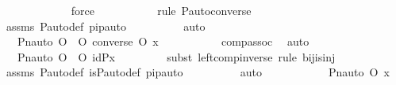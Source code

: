 \begin{isabellebody}
\ \ \ \ \ \ \ \ \ \ \ \isamarkupfalse%
\ force\isanewline
\ \ \ \ \ \ \ \ \ \ \isamarkupfalse%
{\isacharparenleft}{\kern0pt}rule\ P{\isacharunderscore}{\kern0pt}auto{\isacharunderscore}{\kern0pt}converse{\isacharparenright}{\kern0pt}\isanewline
\ \ \ \ \ \ \ \ \isamarkupfalse%
\ assms\ P{\isacharunderscore}{\kern0pt}auto{\isacharunderscore}{\kern0pt}def\ pi{\isacharunderscore}{\kern0pt}pauto\isanewline
\ \ \ \ \ \ \ \ \isamarkupfalse%
\ auto\isanewline
\ \ \ \ \ \ \isamarkupfalse%
\ \isamarkupfalse%
\ {\isachardoublequoteopen}{\isachardot}{\kern0pt}{\isachardot}{\kern0pt}{\isachardot}{\kern0pt}\ {\isacharequal}{\kern0pt}\ Pn{\isacharunderscore}{\kern0pt}auto{\isacharparenleft}{\kern0pt}{\isasympi}\ O\ {\isasymtau}\ O\ {\isacharparenleft}{\kern0pt}converse{\isacharparenleft}{\kern0pt}{\isasympi}{\isacharparenright}{\kern0pt}\ O\ {\isasympi}{\isacharparenright}{\kern0pt}{\isacharparenright}{\kern0pt}{\isacharbackquote}{\kern0pt}x{\isachardoublequoteclose}\ \isanewline
\ \ \ \ \ \ \ \ \isamarkupfalse%
\ comp{\isacharunderscore}{\kern0pt}assoc\ \isamarkupfalse%
\ auto\isanewline
\ \ \ \ \ \ \isamarkupfalse%
\ \isamarkupfalse%
\ {\isachardoublequoteopen}{\isachardot}{\kern0pt}{\isachardot}{\kern0pt}{\isachardot}{\kern0pt}\ {\isacharequal}{\kern0pt}\ Pn{\isacharunderscore}{\kern0pt}auto{\isacharparenleft}{\kern0pt}{\isasympi}\ O\ {\isacharparenleft}{\kern0pt}{\isasymtau}\ O\ id{\isacharparenleft}{\kern0pt}P{\isacharparenright}{\kern0pt}{\isacharparenright}{\kern0pt}{\isacharparenright}{\kern0pt}{\isacharbackquote}{\kern0pt}x{\isachardoublequoteclose}\isanewline
\ \ \ \ \ \ \ \ \isamarkupfalse%
{\isacharparenleft}{\kern0pt}subst\ left{\isacharunderscore}{\kern0pt}comp{\isacharunderscore}{\kern0pt}inverse{\isacharcomma}{\kern0pt}\ rule\ bij{\isacharunderscore}{\kern0pt}is{\isacharunderscore}{\kern0pt}inj{\isacharparenright}{\kern0pt}\isanewline
\ \ \ \ \ \ \ \ \isamarkupfalse%
\ assms\ P{\isacharunderscore}{\kern0pt}auto{\isacharunderscore}{\kern0pt}def\ is{\isacharunderscore}{\kern0pt}P{\isacharunderscore}{\kern0pt}auto{\isacharunderscore}{\kern0pt}def\ pi{\isacharunderscore}{\kern0pt}pauto\isanewline
\ \ \ \ \ \ \ \ \isamarkupfalse%
\ auto\isanewline
\ \ \ \ \ \ \isamarkupfalse%
\ \isamarkupfalse%
\ {\isachardoublequoteopen}{\isachardot}{\kern0pt}{\isachardot}{\kern0pt}{\isachardot}{\kern0pt}\ {\isacharequal}{\kern0pt}\ Pn{\isacharunderscore}{\kern0pt}auto{\isacharparenleft}{\kern0pt}{\isasympi}\ O\ {\isasymtau}{\isacharparenright}{\kern0pt}{\isacharbackquote}{\kern0pt}x{\isachardoublequoteclose}\ \isanewline

\end{isabellebody}
